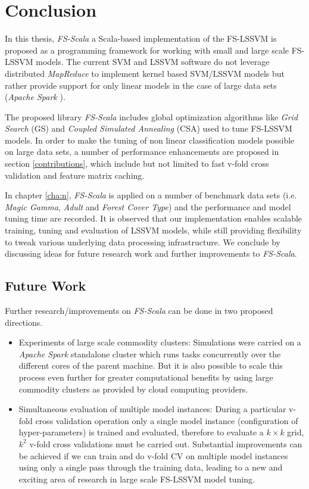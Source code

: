 \chapter{Conclusion}
\label{cha:conclusion}
In this thesis, \textit{FS-Scala} a Scala-based implementation of the FS-LSSVM is proposed as a programming framework for working with small and large scale FS-LSSVM models. The current SVM and LSSVM software do not leverage distributed \textit{MapReduce} to implement kernel based SVM/LSSVM models but rather provide support for only linear models in the case of large data sets (\textit{Apache Spark} \cite{Spark:2010}). 

The proposed library \textit{FS-Scala} includes global optimization algorithms like \textit{Grid Search} (GS) and \textit{Coupled Simulated Annealing} (CSA) used to tune FS-LSSVM models. In order to make the tuning of non linear classification models possible on large data sets, a number of performance enhancements are proposed in section \ref{contributions}, which include but not limited to fast v-fold cross validation and feature matrix caching.

In chapter \ref{cha:n}, \textit{FS-Scala} is applied on a number of benchmark data sets (i.e. \textit{Magic Gamma}, \textit{Adult} and \textit{Forest Cover Type}) and the performance and model tuning time are recorded. It is observed that our implementation enables scalable training, tuning and evaluation of LSSVM models, while still providing flexibility to tweak various underlying data processing infrastructure. We conclude by discussing ideas for future research work and further improvements to \textit{FS-Scala}. 

\section{Future Work}

Further research/improvements on \textit{FS-Scala} can be done in two proposed directions.

\begin{itemize}
\item Experiments of large scale commodity clusters:
Simulations were carried on a \emph{Apache Spark} standalone cluster which runs tasks concurrently over the different cores of the parent machine. But it is also possible to scale this process even further for greater computational benefits by using large commodity clusters as provided by cloud computing providers.

\item Simultaneous evaluation of multiple model instances:
During a particular v-fold cross validation operation only a single model instance (configuration of hyper-parameters) is trained and  evaluated, therefore to evaluate a $k \times k$ grid, $k^2$ v-fold cross validations must be carried out. Substantial improvements can be achieved if we can train and do v-fold CV on multiple model instances using only a single pass through the training data, leading to a new and exciting area of research in large scale FS-LSSVM model tuning. 
\end{itemize}